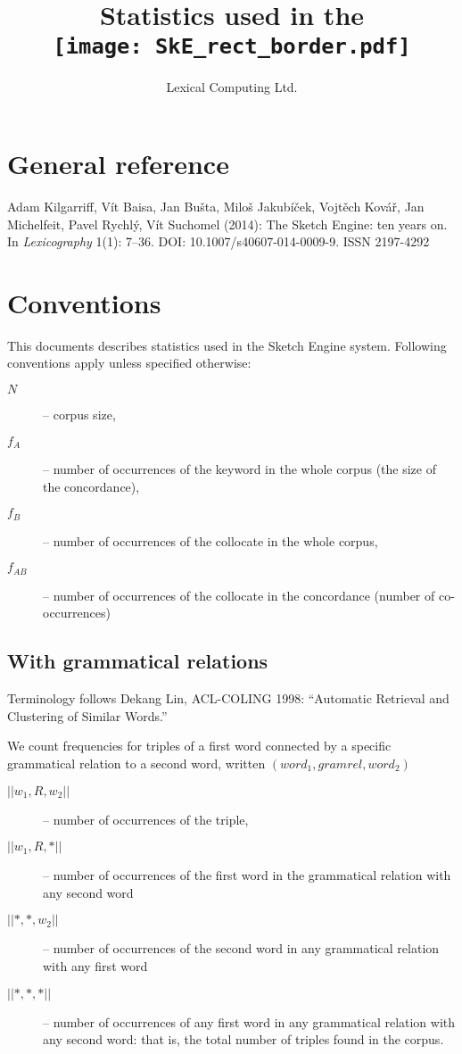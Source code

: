 \documentclass{article}
\title{Statistics used in the\\\bigskip\texttt{[image: SkE\_rect\_border.pdf]}}
\author{Lexical Computing Ltd.}
\begin{document}
\setlength{\parindent}{0cm}
\maketitle
\section{General reference}
Adam Kilgarriff, Vít Baisa, Jan Bušta, Miloš Jakubíček, Vojtěch Kovář, Jan Michelfeit, Pavel Rychlý, Vít Suchomel (2014): The Sketch Engine: ten years on. In {\it Lexicography} 1(1): 7--36. DOI: 10.1007/s40607-014-0009-9. ISSN 2197-4292

\section {Conventions}
This documents describes statistics used in the Sketch Engine system. Following conventions apply unless specified otherwise:

\begin{description}
\item[$N$]-- corpus size, 
\item[$f_A$]-- number of occurrences of the keyword in the whole corpus
(the size of the concordance), 
\item[$f_B$]-- number of occurrences of the collocate in the whole corpus,
\item[$f_{AB}$]-- number of occurrences of the collocate in the concordance
(number of co-occurrences)
\end{description}

\subsection{With grammatical relations}

Terminology follows Dekang Lin, ACL-COLING 1998: ``Automatic Retrieval and Clustering of Similar Words.''

We count frequencies for triples  of a first word  connected by a specific grammatical relation to a second word, written $(word_1, gramrel, word_2)$
\begin{description}
\item[$||w_1,R,w_2||$]-- number of occurrences of the triple, 
\item[$||w_1,R,*||$]--  number of occurrences of the first word in the grammatical relation with any second word
\item[$||*, *, w_2||$]--  number of occurrences of the second word in any grammatical relation with any first word
\item[$||*, *, *||$]--  number of occurrences of any first word in any grammatical relation with any second word: that is, the total number of triples found in the corpus.
\end{description}
\end{document}
